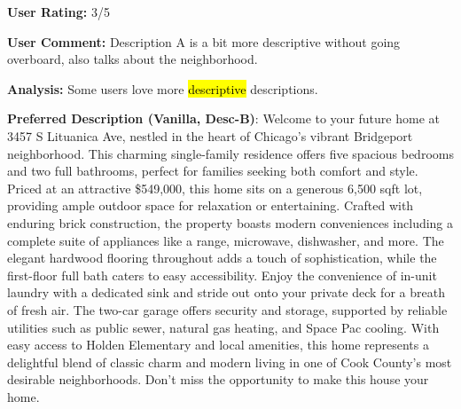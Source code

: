 \begin{center}
\begin{tcolorbox}[colback=white,colframe=gray!20,width=0.95\textwidth]
    {\footnotesize \textbf{User Rating:} 3/5 }
    \vspace{0.2em}

    {\footnotesize \textbf{User Comment:} Description A is a bit more descriptive without going overboard, also talks about the neighborhood. }
    \vspace{0.2em}

   {\footnotesize \textbf{Analysis:} Some users love more \hl{descriptive} descriptions.  }
    \end{tcolorbox}\end{center}

\begin{center}\begin{tcolorbox}[colback=white,colframe=gray!20,width=0.95\textwidth]
   {\footnotesize \textbf{Preferred Description (Vanilla, Desc-B)}:  Welcome to your future home at 3457 S Lituanica Ave, nestled in the heart of Chicago's vibrant Bridgeport neighborhood. This charming single-family residence offers five spacious bedrooms and two full bathrooms, perfect for families seeking both comfort and style. Priced at an attractive \$549,000, this home sits on a generous 6,500 sqft lot, providing ample outdoor space for relaxation or entertaining. Crafted with enduring brick construction, the property boasts modern conveniences including a complete suite of appliances like a range, microwave, dishwasher, and more. The elegant hardwood flooring throughout adds a touch of sophistication, while the first-floor full bath caters to easy accessibility. Enjoy the convenience of in-unit laundry with a dedicated sink and stride out onto your private deck for a breath of fresh air. The two-car garage offers security and storage, supported by reliable utilities such as public sewer, natural gas heating, and Space Pac cooling. With easy access to Holden Elementary and local amenities, this home represents a delightful blend of classic charm and modern living in one of Cook County's most desirable neighborhoods. Don't miss the opportunity to make this house your home. }
    \vspace{0.2em}


\end{tcolorbox}
\end{center}
